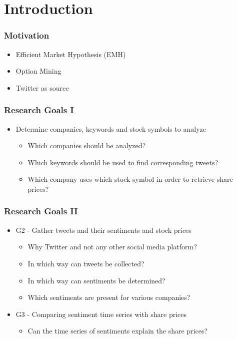 \section{Introduction}
 
\begin{frame}
    \frametitle{Motivation}
    
    \begin{itemize}
        \item Efficient Market Hypothesis (EMH)
        \item Option Mining
        \item Twitter as source
    \end{itemize}
\end{frame}

\begin{frame}
    \frametitle{Research Goals I}
    
    \begin{itemize}
        \item Determine companies, keywords and stock symbols to analyze
        
        \begin{itemize}
            \item Which companies should be analyzed?
            \item Which keywords should be used to find corresponding tweets?
            \item Which company uses which stock symbol in order to retrieve share prices?
        \end{itemize}

    \end{itemize}
\end{frame}

\begin{frame}
    \frametitle{Research Goals II}
    
    \begin{itemize}

        \item G2 - Gather tweets and their sentiments and stock prices
        
        \begin{itemize}
            \item Why Twitter and not any other social media platform?
            \item In which way can tweets be collected?
            \item In which way can sentiments be determined?
            \item Which sentiments are present for various companies?
        \end{itemize}

        \item G3 - Comparing sentiment time series with share prices
        
        \begin{itemize}
            \item Can the time series of sentiments explain the share prices?
        \end{itemize}

    \end{itemize}
\end{frame}
